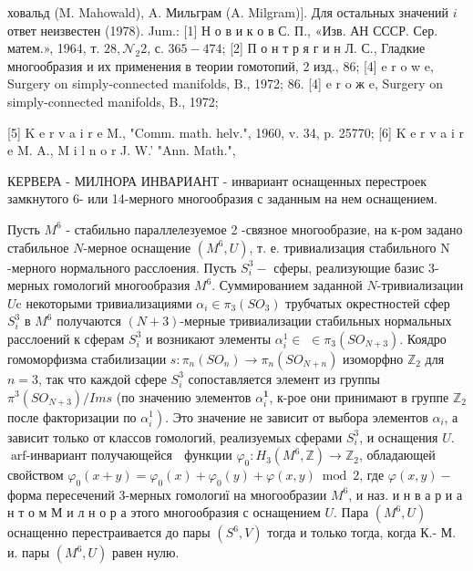 \documentclass[10pt]{article}
\begin{document}
ховальд (M. Mahowald), A. Мильграм (A. Milgram)]. Для остальных значений $i$ ответ неизвестен (1978). Jum.: [1] Н о в и к о в С. П., «Изв. АН СССР. Сер. матем.», 1964, т. $28, \mathcal{N}_{2} 2$, с. $365-474$; [2] П о н т р я г и н Л. С., Гладкие многообразия и их применения в теории гомотопий, 2 изд., 86; [4] e r o w e, Surgery on simply-connected manifolds, B., 1972; 86. [4] e r o ж e, Surgery on simply-connected manifolds, B., 1972;

[5] K e r v a i r e M., "Comm. math. helv.", 1960, v. 34, p. 25770; [6] K e r v a i r e M. A., M i l n o r J. W.' "Ann. Math.",



КЕРВЕРА - МИЛНОРА ИНВАРИАНТ - инвариант оснащенных перестроек замкнутого 6- или 14-мерного многообразия с заданным на нем оснащением.



Пусть $M^{6}$ - стабильно параллелезуемое 2 -связное многообразие, на к-ром задано стабильное $N$-мерное оснащение $\left(M^{6}, U\right)$, т. е. тривиализация стабильного $\mathrm{N}$-мерного нормального расслоения. Пусть $S_{i}^{3}-$ сферы, реализующие базис 3-мерных гомологий многообразия $M^{6}$. Суммированием заданной $N$-тривиализации $U \mathrm{c}$ некоторыми тривиализациями $\alpha_{i} \in \pi_{3}\left(S O_{3}\right)$ трубчатых окрестностей сфер $S_{i}^{3}$ в $M^{6}$ получаются $(N+3)$-мерные тривиализации стабильных нормальных расслоений к сферам $S_{i}^{3}$ и возникают элементы $\alpha_{i}^{1} \in$ $\in \pi_{3}\left(S O_{N+3}\right)$. Коядро гомоморфизма стабилизации $s: \pi_{n}\left(S O_{n}\right) \rightarrow \pi_{n}\left(S O_{N+n}\right)$ изоморфно $\mathbb{Z}_{2}$ для $n=3$, так что каждой сфере $S_{i}^{3}$ сопоставляется элемент из группы $\pi^{3}\left(S O_{N+3}\right) / I m s$ (по значению элементов $\alpha_{i}^{\mathbf{1}}$, к-рое они принимают в группе $\mathbb{Z}_{2}$ после факторизации по $\left.\alpha_{i}^{1}\right)$. Это значение не зависит от выбора элементов $\alpha_{i}$, а зависит только от классов гомологий, реализуемых сферами $S_{i}^{3}$, и оснащения $U$. $\operatorname{arf-инвариант~получающейся~}$ функции $\varphi_{0}: H_{3}\left(M^{6}, \mathbb{Z}\right) \rightarrow \mathbb{Z}_{2}$, обладающей свойством $\varphi_{0}(x+y)=\varphi_{0}(x)+\varphi_{0}(y)+\varphi(x, y) \bmod 2$, где $\varphi(x, y)-$ форма пересечений 3-мерных гомологиї на многообразии $M^{6}$, и наз. и н в а р и а н т о м М и л н о р а этого многообразия с оснащением $U$. Пара $\left(M^{6}, U\right)$ оснащенно перестраивается до пары $\left(S^{6}, V\right)$ тогда и только тогда, когда К.- М. и. пары $\left(M^{6}, U\right)$ равен нулю.
\end{document}
